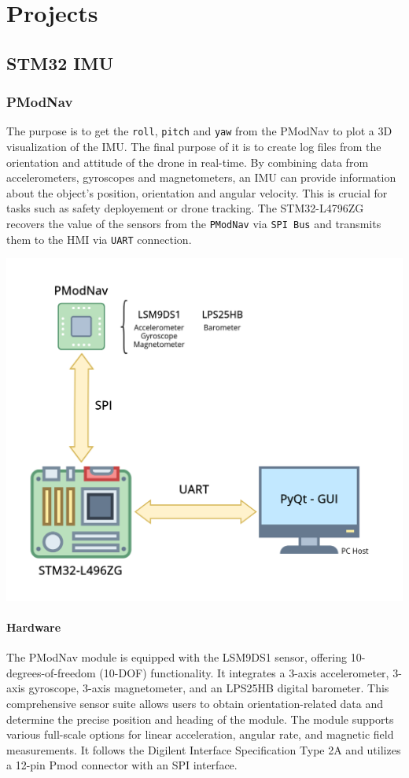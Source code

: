 \chapter{Projects}

\section{STM32 IMU}
\subsection{PModNav}
The purpose is to get the \texttt{roll}, \texttt{pitch} and \texttt{yaw} from the PModNav to plot a 3D visualization of the IMU. The final purpose of it is to create log files from the orientation and attitude of the drone in real-time. By combining data from accelerometers, gyroscopes and magnetometers, an IMU can provide information about the object's position, orientation and angular velocity. This is crucial for tasks such as safety deployement or drone tracking.
The STM32-L4796ZG recovers the value of the sensors from the \texttt{PModNav} via \texttt{SPI Bus} and transmits them to the HMI via \texttt{UART} connection.
\begin{center}
    \includegraphics[width=0.65\linewidth]{./projects/pmodnav/com.png}
\end{center}

\subsubsection{Hardware}
The PModNav module is equipped with the LSM9DS1 sensor, offering 10-degrees-of-freedom (10-DOF) functionality. It integrates a 3-axis accelerometer, 3-axis gyroscope, 3-axis magnetometer, and an LPS25HB digital barometer. This comprehensive sensor suite allows users to obtain orientation-related data and determine the precise position and heading of the module. The module supports various full-scale options for linear acceleration, angular rate, and magnetic field measurements. It follows the Digilent Interface Specification Type 2A and utilizes a 12-pin Pmod connector with an SPI interface.

